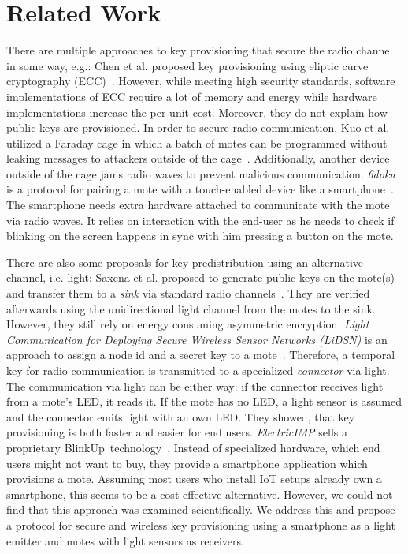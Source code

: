 \documentclass{sig-alternate} %
\begin{document}
\section{Related Work}
\label{sec:related_work}

There are multiple approaches to key provisioning that secure the radio channel in some way, e.g.:
Chen et al. proposed key provisioning using eliptic curve cryptography (ECC)~\cite{chen2011over}.
However, while meeting high security standards, software implementations of ECC require a lot of memory and energy while hardware implementations increase the per-unit cost.
Moreover, they do not explain how public keys are provisioned.
In order to secure radio communication, Kuo et al. utilized a Faraday cage in which a batch of motes can be programmed without leaking messages to attackers outside of the cage~\cite{kuo2007message}.
Additionally, another device outside of the cage jams radio waves to prevent malicious communication.
\textit{6doku} is a protocol for pairing  a mote with a touch-enabled device like a smartphone~\cite{krentz20156doku}.
The smartphone needs extra hardware attached to communicate with the mote via radio waves.
It relies on interaction with the end-user as he needs to check if blinking on the screen happens in sync with him pressing a button on the mote.

There are also some proposals for key predistribution using an alternative channel, i.e. light:
Saxena et al. proposed to generate public keys on the mote(s) and transfer them to a \textit{sink} via standard radio channels~\cite{saxena2009blink}.
They are verified afterwards using the unidirectional light channel from the motes to the sink.
However, they still rely on energy consuming asymmetric encryption.
\textit{Light Communication for Deploying Secure Wireless Sensor Networks (LiDSN)} is an approach to assign a node id and a secret key to a mote~\cite{doan2012lidsn}.
Therefore, a temporal key for radio communication is transmitted to a specialized \textit{connector} via light.
The communication via light can be either way: if the connector receives light from a mote's LED, it reads it. 
If the mote has no LED, a light sensor is assumed and the connector emits light with an own LED.
They showed, that key provisioning is both faster and easier for end users.
\textit{ElectricIMP} sells a proprietary BlinkUp\texttrademark~technology~\cite{electricimp}.
Instead of specialized hardware, which end users might not want to buy, they provide a smartphone application which provisions a mote.
Assuming most users who install IoT setups already own a smartphone, this seems to be a cost-effective alternative.
However, we could not find that this approach was examined scientifically.
We address this and propose a protocol for secure and wireless key provisioning using a smartphone as a light emitter and motes with light sensors as receivers.
\end{document}
